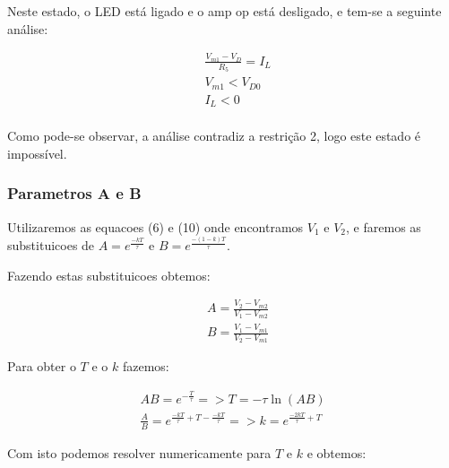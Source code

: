Neste estado, o LED está ligado e o amp op está desligado, e tem-se a seguinte análise:

\begin{equation}
    \begin{aligned}
         & \frac{V_{m1} - V_{D}}{R_5} = I_L \\
         & V_{m1} < V_{D0}                  \\
         & I_L < 0                          \\
    \end{aligned}
\end{equation}

Como pode-se observar, a análise contradiz a restrição 2, logo este estado é impossível.

\subsubsection{Parametros A e B}

Utilizaremos as equacoes (6) e (10) onde encontramos $V_1$ e $V_2$, e faremos as substituicoes de $A = e^{\frac{-kT}{\tau}}$ e $B = e^{\frac{-(1-k)T}{\tau}}$.

Fazendo estas substituicoes obtemos:

\begin{equation}
    \begin{aligned}
         & A = \frac{V_2 - V_{m2}}{V_1 - V_{m2}} \\
         & B = \frac{V_1 -V_{m1}}{V_2 - V_{m1}}
    \end{aligned}
\end{equation}

Para obter o $T$ e o $k$ fazemos:

\begin{equation}
    \begin{aligned}
        A B = e^{-\frac{T}{\tau}} => T = - \tau \ln(A B) \\
        \frac{A}{B} = e^{\frac{-kT}{\tau} + T - \frac{-kT}{\tau}} => k = e^{\frac{-2kT}{\tau} + T}
    \end{aligned}
\end{equation}

Com isto podemos resolver numericamente para $T$ e $k$ e obtemos:

